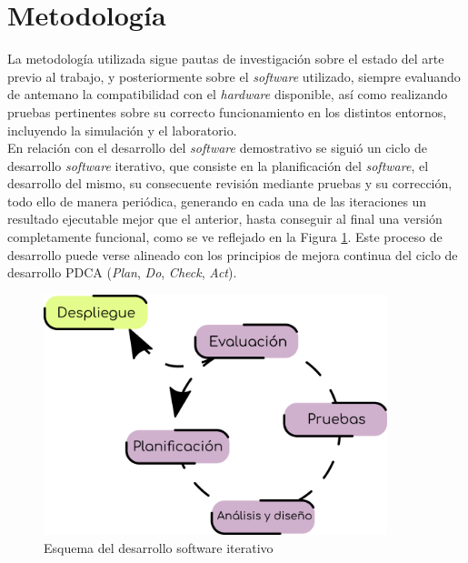 
\section{Metodología}
\label{sec:metodologia}

La metodología utilizada sigue pautas de investigación sobre el estado del arte
previo al trabajo, y posteriormente sobre el \textit{software} utilizado,
siempre evaluando de antemano la compatibilidad con el \textit{hardware}
disponible, así como realizando pruebas pertinentes sobre su correcto
funcionamiento en los distintos entornos, incluyendo la simulación y el
laboratorio.
\\

En relación con el desarrollo del \textit{software} demostrativo se siguió un
ciclo de desarrollo \textit{software} iterativo, que consiste en la
planificación del \textit{software}, el desarrollo del mismo, su consecuente
revisión mediante pruebas y su corrección, todo ello de manera periódica,
generando en cada una de las iteraciones un resultado ejecutable mejor que el
anterior, hasta conseguir al final una versión completamente funcional, como se
ve reflejado en la Figura \ref{fig:desarrollo_iterativo}.
Este proceso de desarrollo puede verse alineado con los principios de mejora
continua del ciclo de desarrollo PDCA (\textit{Plan}, \textit{Do},
\textit{Check}, \textit{Act}).
\\

\begin{figure} [h!]
  \begin{center}
    \includegraphics[width=10cm]{figs/desarrollo_iterativo}
  \end{center}
  \caption{Esquema del desarrollo software iterativo}
  \label{fig:desarrollo_iterativo}
\end{figure}\

